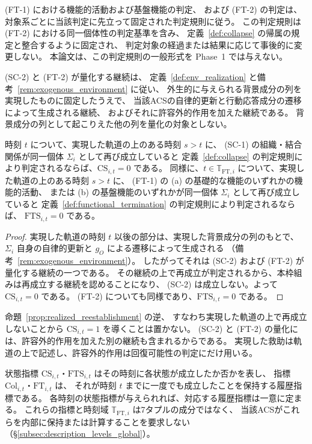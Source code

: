 \begin{definition}[機能的終端状態指標と機能的終端指標]
(FT-1) における機能的活動および基盤機能の判定、
および (FT-2) の判定は、対象系ごとに当該判定に先立って固定された判定規則に従う。
この判定規則は (FT-2) における同一個体性の判定基準を含み、
定義~\ref{def:collapse} の帰属の規定と整合するように固定され、
判定対象の経過または結果に応じて事後的に変更しない。
本論文は、この判定規則の一般形式を Phase~1 では与えない。
\end{definition}

(SC-2) と (FT-2) が量化する継続は、
定義~\ref{def:env_realization} と備考~\ref{rem:exogenous_environment} に従い、
外生的に与えられる背景成分の列を実現したものに固定したうえで、
当該ACSの自律的更新と行動応答成分の遷移によって生成される継続、
およびそれに許容外的作用を加えた継続である。
背景成分の列として起こりえた他の列を量化の対象としない。

\begin{proposition}[実現した軌道上の再成立]
\label{prop:realized_reestablishment}
時刻 $t$ について、実現した軌道の上のある時刻 $s>t$ に、
(SC-1) の組織・結合関係が同一個体 $\Sigma_i$ として再び成立していると
定義~\ref{def:collapse} の判定規則により判定されるならば、$\mathrm{CS}_{i,t}=0$ である。
同様に、$t\in\mathbb{T}_{\mathrm{FT},i}$ について、実現した軌道の上のある時刻 $s>t$ に、
(FT-1) の (a) の基礎的な機能のいずれかの機能的活動、
または (b) の基盤機能のいずれかが同一個体 $\Sigma_i$ として再び成立していると
定義~\ref{def:functional_termination} の判定規則により判定されるならば、
$\mathrm{FTS}_{i,t}=0$ である。
\end{proposition}

\begin{proof}
実現した軌道の時刻 $t$ 以後の部分は、実現した背景成分の列のもとで、
$\Sigma_i$ 自身の自律的更新と $g_O$ による遷移によって生成される
（備考~\ref{rem:exogenous_environment}）。
したがってそれは (SC-2) および (FT-2) が量化する継続の一つである。
その継続の上で再成立が判定されるから、本枠組みは再成立する継続を認めることになり、
(SC-2) は成立しない。よって $\mathrm{CS}_{i,t}=0$ である。
(FT-2) についても同様であり、$\mathrm{FTS}_{i,t}=0$ である。
\end{proof}

命題~\ref{prop:realized_reestablishment} の逆、
すなわち実現した軌道の上で再成立しないことから $\mathrm{CS}_{i,t}=1$ を導くことは置かない。
(SC-2) と (FT-2) の量化には、許容外的作用を加えた別の継続も含まれるからである。
実現した救助は軌道の上で記述し、許容外的作用は回復可能性の判定にだけ用いる。

状態指標 $\mathrm{CS}_{i,t}$・$\mathrm{FTS}_{i,t}$ はその時刻に各状態が成立したか否かを表し、
指標 $\mathrm{Col}_{i,t}$・$\mathrm{FT}_{i,t}$ は、
それが時刻 $t$ までに一度でも成立したことを保持する履歴指標である。
各時刻の状態指標が与えられれば、対応する履歴指標は一意に定まる。
これらの指標と時刻域 $\mathbb{T}_{\mathrm{FT},i}$ は7タプルの成分ではなく、
当該ACSがこれらを内部に保持または計算することを要求しない
（\S\ref{subsec:description_levels_global}）。


